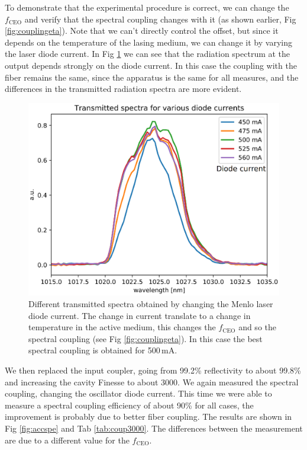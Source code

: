 To demonstrate that the experimental procedure is correct, we can change the $f_\mathrm{CEO}$ and verify that the spectral coupling changes with it (as shown earlier, Fig \ref{fig:couplingeta}). Note that we can't directly control the offset, but since it depends on the temperature of the lasing medium, we can change it by varying the laser diode current. In Fig \ref{fig:currents} we can see that the radiation spectrum at the output depends strongly on the diode current. In this case the coupling with the fiber remains the same, since the apparatus is the same for all measures, and the differences in the transmitted radiation spectra are more evident.

\begin{figure}
	\centering
	\includegraphics[width=0.9\linewidth]{images/currents.eps}
	\caption{Different transmitted spectra obtained by changing the Menlo laser diode current. The change in current translate to a change in temperature in the active medium, this changes the $f_\mathrm{CEO}$ and so the spectral coupling (see Fig \ref{fig:couplingeta}). In this case the best spectral coupling is obtained for 500\,mA.}
	\label{fig:currents}
\end{figure}

We then replaced the input coupler, going from 99.2\% reflectivity to about 99.8\% and increasing the cavity Finesse to about 3000.
We again measured the spectral coupling, changing the oscillator diode current. This time we were able to measure a spectral coupling efficiency of about 90\% for all cases, the improvement is probably due to better fiber coupling. The results are shown in Fig \ref{fig:accspe} and Tab \ref{tab:coup3000}. The differences between the measurement are due to a different value for the $f_\mathrm{CEO}$.


